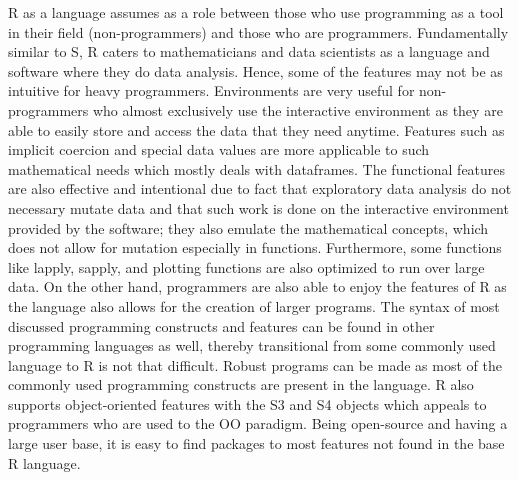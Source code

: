 \documentclass[12pt]{article}
\begin{document}
R as a language assumes as a role between those who use programming as a tool in their field (non-programmers) and those who are programmers. Fundamentally similar to S, R caters to mathematicians and data scientists as a language and software where they do data analysis. Hence, some of the features may not be as intuitive for heavy programmers. Environments are very useful for non-programmers who almost exclusively use the interactive environment as they are able to easily store and access the data that they need anytime. Features such as implicit coercion and special data values are more applicable to such mathematical needs which mostly deals with dataframes. The functional features are also effective and intentional due to fact that exploratory data analysis do not necessary mutate data and that such work is done on the interactive environment provided by the software; they also emulate the mathematical concepts, which does not allow for mutation especially in functions. Furthermore, some functions like lapply, sapply, and plotting functions are also optimized to run over large data. On the other hand, programmers are also able to enjoy the features of R as the language also allows for the creation of larger programs. The syntax of most discussed programming constructs and features can be found in other programming languages as well, thereby transitional from some commonly used language to R is not that difficult. Robust programs can be made as most of the commonly used programming constructs are present in the language. R also supports object-oriented features with the S3 and S4 objects which appeals to programmers who are used to the OO paradigm. Being open-source and having a large user base, it is easy to find packages to most features not found in the base R language.
\end{document}
